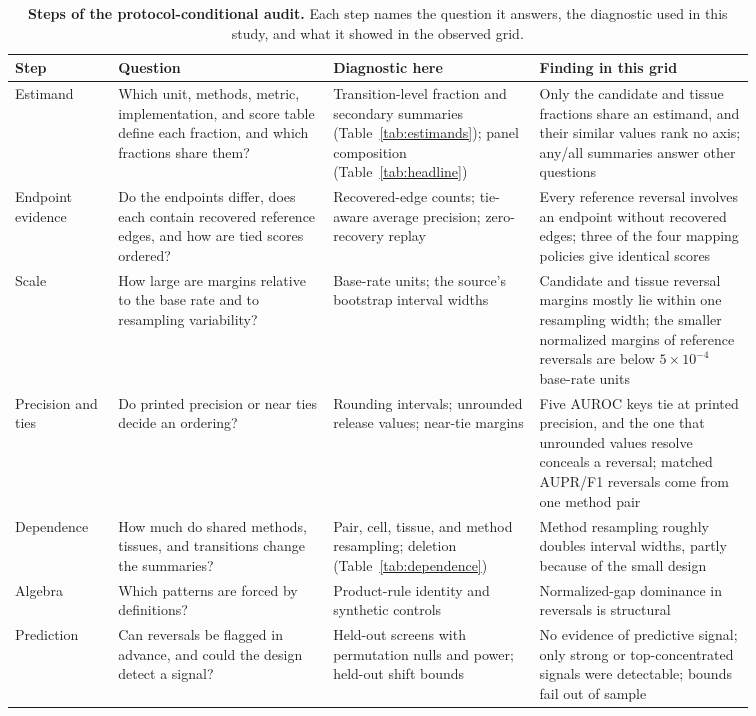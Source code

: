 \documentclass[10pt,letterpaper]{article}
\begin{document}
\begin{table}[!ht]
\centering
\caption{{\bf Steps of the protocol-conditional audit.} Each step names the question it answers, the diagnostic used in this study, and what it showed in the observed grid.}
\footnotesize
\begin{tabular}{>{\raggedright\arraybackslash}p{0.12\linewidth}>{\raggedright\arraybackslash}p{0.25\linewidth}>{\raggedright\arraybackslash}p{0.24\linewidth}>{\raggedright\arraybackslash}p{0.25\linewidth}}
\toprule
\textbf{Step} & \textbf{Question} & \textbf{Diagnostic here} & \textbf{Finding in this grid}\\
\midrule
Estimand & Which unit, methods, metric, implementation, and score table define each fraction, and which fractions share them? & Transition-level fraction and secondary summaries (Table~\ref{tab:estimands}); panel composition (Table~\ref{tab:headline}) & Only the candidate and tissue fractions share an estimand, and their similar values rank no axis; any/all summaries answer other questions\\
\addlinespace[2pt]
Endpoint evidence & Do the endpoints differ, does each contain recovered reference edges, and how are tied scores ordered? & Recovered-edge counts; tie-aware average precision; zero-recovery replay & Every reference reversal involves an endpoint without recovered edges; three of the four mapping policies give identical scores\\
\addlinespace[2pt]
Scale & How large are margins relative to the base rate and to resampling variability? & Base-rate units; the source's bootstrap interval widths & Candidate and tissue reversal margins mostly lie within one resampling width; the smaller normalized margins of reference reversals are below $5\times10^{-4}$ base-rate units\\
\addlinespace[2pt]
Precision and ties & Do printed precision or near ties decide an ordering? & Rounding intervals; unrounded release values; near-tie margins & Five AUROC keys tie at printed precision, and the one that unrounded values resolve conceals a reversal; matched AUPR/F1 reversals come from one method pair\\
\addlinespace[2pt]
Dependence & How much do shared methods, tissues, and transitions change the summaries? & Pair, cell, tissue, and method resampling; deletion (Table~\ref{tab:dependence}) & Method resampling roughly doubles interval widths, partly because of the small design\\
\addlinespace[2pt]
Algebra & Which patterns are forced by definitions? & Product-rule identity and synthetic controls & Normalized-gap dominance in reversals is structural\\
\addlinespace[2pt]
Prediction & Can reversals be flagged in advance, and could the design detect a signal? & Held-out screens with permutation nulls and power; held-out shift bounds & No evidence of predictive signal; only strong or top-concentrated signals were detectable; bounds fail out of sample\\
\bottomrule
\end{tabular}
\label{tab:audit}
\end{table}
\end{document}
